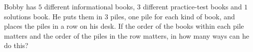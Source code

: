 Bobby has $5$ different informational books, $3$ different practice-test books and $1$ solutions book. He puts them in $3$ piles, one pile for each kind of book, and places the piles in a row on his desk. If the order of the books within each pile matters and the order of the piles in the row matters, in how many ways can he do this?
